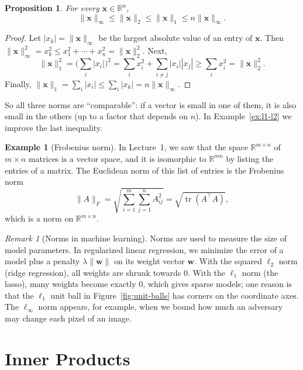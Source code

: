 \documentclass[11pt]{article}
\newcommand{\norm}[1]{\lVert #1 \rVert}
\theoremstyle{definition}
\newtheorem{example}[definition]{Example}
\theoremstyle{plain}
\newtheorem{proposition}[definition]{Proposition}
\theoremstyle{remark}
\newtheorem{remark}[definition]{Remark}
\DeclareMathOperator{\tr}{tr}
\begin{document}
\begin{proposition}\label{prop:norm-comparison}
    For every $\mathbf{x} \in \mathbb{R}^n$,
    \[\norm{\mathbf{x}}_\infty \leq \norm{\mathbf{x}}_2 \leq \norm{\mathbf{x}}_1 \leq n \norm{\mathbf{x}}_\infty.\]
\end{proposition}

\begin{proof}
    Let $|x_k| = \norm{\mathbf{x}}_\infty$ be the largest absolute value of an entry of $\mathbf{x}$. Then $\norm{\mathbf{x}}_\infty^2 = x_k^2 \leq x_1^2 + \cdots + x_n^2 = \norm{\mathbf{x}}_2^2$. Next,
    \[\norm{\mathbf{x}}_1^2 = \Big(\sum_i |x_i|\Big)^2 = \sum_i x_i^2 + \sum_{i \neq j} |x_i| |x_j| \geq \sum_i x_i^2 = \norm{\mathbf{x}}_2^2.\]
    Finally, $\norm{\mathbf{x}}_1 = \sum_i |x_i| \leq \sum_i |x_k| = n \norm{\mathbf{x}}_\infty$.
\end{proof}

So all three norms are ``comparable'': if a vector is small in one of them, it is also small in the others (up to a factor that depends on $n$). In Example~\ref{ex:l1-l2} we improve the last inequality.

\begin{example}[Frobenius norm]
    In Lecture~1, we saw that the space $\mathbb{R}^{m \times n}$ of $m \times n$ matrices is a vector space, and it is isomorphic to $\mathbb{R}^{mn}$ by listing the entries of a matrix. The Euclidean norm of this list of entries is the Frobenius norm
    \[\norm{A}_F = \sqrt{\sum_{i=1}^m \sum_{j=1}^n A_{ij}^2} = \sqrt{\tr(A^\top A)},\]
    which is a norm on $\mathbb{R}^{m \times n}$.
\end{example}

\begin{remark}[Norms in machine learning]
    Norms are used to measure the size of model parameters. In regularized linear regression, we minimize the error of a model plus a penalty $\lambda \norm{\mathbf{w}}$ on its weight vector $\mathbf{w}$. With the squared $\ell_2$ norm (ridge regression), all weights are shrunk towards $0$. With the $\ell_1$ norm (the lasso), many weights become exactly $0$, which gives sparse models; one reason is that the $\ell_1$ unit ball in Figure~\ref{fig:unit-balls} has corners on the coordinate axes. The $\ell_\infty$ norm appears, for example, when we bound how much an adversary may change each pixel of an image.
\end{remark}

\section{Inner Products}
\end{document}
